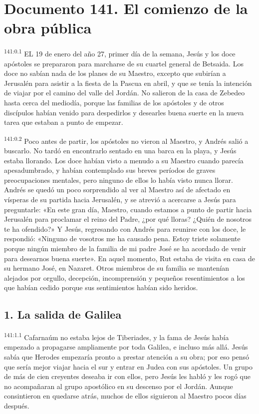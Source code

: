 \chapter{Documento 141. El comienzo de la obra pública}
\par 
\textsuperscript{141:0.1} EL 19 de enero del año 27, primer día de la semana, Jesús y los doce apóstoles se prepararon para marcharse de su cuartel general de Betsaida. Los doce no sabían nada de los planes de su Maestro, excepto que subirían a Jerusalén para asistir a la fiesta de la Pascua en abril, y que se tenía la intención de viajar por el camino del valle del Jordán. No salieron de la casa de Zebedeo hasta cerca del mediodía, porque las familias de los apóstoles y de otros discípulos habían venido para despedirlos y desearles buena suerte en la nueva tarea que estaban a punto de empezar.

\par 
\textsuperscript{141:0.2} Poco antes de partir, los apóstoles no vieron al Maestro, y Andrés salió a buscarlo. No tardó en encontrarlo sentado en una barca en la playa, y Jesús estaba llorando. Los doce habían visto a menudo a su Maestro cuando parecía apesadumbrado, y habían contemplado sus breves períodos de graves preocupaciones mentales, pero ninguno de ellos lo había visto nunca llorar. Andrés se quedó un poco sorprendido al ver al Maestro así de afectado en vísperas de su partida hacia Jerusalén, y se atrevió a acercarse a Jesús para preguntarle: «En este gran día, Maestro, cuando estamos a punto de partir hacia Jerusalén para proclamar el reino del Padre, ¿por qué lloras? ¿Quién de nosotros te ha ofendido?» Y Jesús, regresando con Andrés para reunirse con los doce, le respondió: «Ninguno de vosotros me ha causado pena. Estoy triste solamente porque ningún miembro de la familia de mi padre José se ha acordado de venir para desearnos buena suerte». En aquel momento, Rut estaba de visita en casa de su hermano José, en Nazaret. Otros miembros de su familia se mantenían alejados por orgullo, decepción, incomprensión y pequeños resentimientos a los que habían cedido porque sus sentimientos habían sido heridos.

\section*{1. La salida de Galilea}
\par 
\textsuperscript{141:1.1} Cafarnaúm no estaba lejos de Tiberiades, y la fama de Jesús había empezado a propagarse ampliamente por toda Galilea, e incluso más allá. Jesús sabía que Herodes empezaría pronto a prestar atención a su obra; por eso pensó que sería mejor viajar hacia el sur y entrar en Judea con sus apóstoles. Un grupo de más de cien creyentes deseaba ir con ellos, pero Jesús les habló y les rogó que no acompañaran al grupo apostólico en su descenso por el Jordán. Aunque consintieron en quedarse atrás, muchos de ellos siguieron al Maestro pocos días después.

